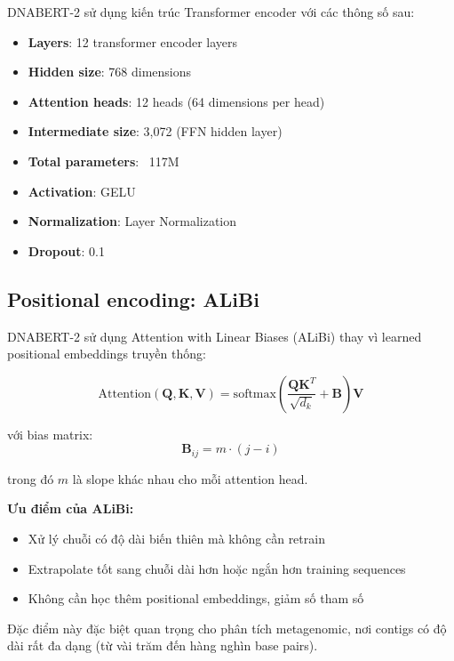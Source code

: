 DNABERT-2 sử dụng kiến trúc Transformer encoder với các thông số sau:

\begin{itemize}
    \item \textbf{Layers}: 12 transformer encoder layers
    \item \textbf{Hidden size}: 768 dimensions
    \item \textbf{Attention heads}: 12 heads (64 dimensions per head)
    \item \textbf{Intermediate size}: 3,072 (FFN hidden layer)
    \item \textbf{Total parameters}: ~117M
    \item \textbf{Activation}: GELU
    \item \textbf{Normalization}: Layer Normalization
    \item \textbf{Dropout}: 0.1
\end{itemize}

\subsection{Positional encoding: ALiBi}

DNABERT-2 sử dụng Attention with Linear Biases (ALiBi) \cite{press2021train} thay vì learned positional embeddings truyền thống:

\begin{equation}
\text{Attention}(\mathbf{Q}, \mathbf{K}, \mathbf{V}) = \text{softmax}\left(\frac{\mathbf{Q}\mathbf{K}^T}{\sqrt{d_k}} + \mathbf{B}\right)\mathbf{V}
\end{equation}

với bias matrix:
\begin{equation}
\mathbf{B}_{ij} = m \cdot (j - i)
\end{equation}

trong đó $m$ là slope khác nhau cho mỗi attention head.

\textbf{Ưu điểm của ALiBi:}
\begin{itemize}
    \item Xử lý chuỗi có độ dài biến thiên mà không cần retrain
    \item Extrapolate tốt sang chuỗi dài hơn hoặc ngắn hơn training sequences
    \item Không cần học thêm positional embeddings, giảm số tham số
\end{itemize}

Đặc điểm này đặc biệt quan trọng cho phân tích metagenomic, nơi contigs có độ dài rất đa dạng (từ vài trăm đến hàng nghìn base pairs).

